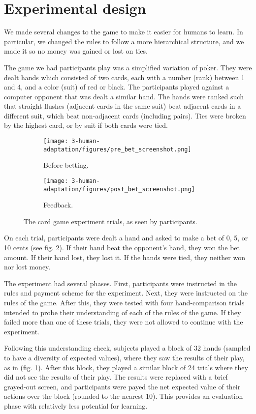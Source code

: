 \section{Experimental design}
We made several changes to the game to make it easier for humans to learn. In particular, we changed the rules to follow a more hierarchical structure, and we made it so no money was gained or lost on ties. \par
The game we had participants play was a simplified variation of poker. They were dealt hands which consisted of two cards, each with a number (rank) between 1 and 4, and a color (suit) of red or black. The participants played against a computer opponent that was dealt a similar hand. The hands were ranked such that straight flushes (adjacent cards in the same suit) beat adjacent cards in a different suit, which beat non-adjacent cards (including pairs). Ties were broken by the highest card, or by suit if both cards were tied. \par
\begin{figure}
\centering
\begin{subfigure}[b]{0.5\textwidth}
\texttt{[image: 3-human-adaptation/figures/pre\_bet\_screenshot.png]}
\caption{Before betting.}
\end{subfigure}%
\begin{subfigure}[b]{0.5\textwidth}
\texttt{[image: 3-human-adaptation/figures/post\_bet\_screenshot.png]}
\caption{Feedback.} \label{fig_human_betting_trial_feedback}
\end{subfigure}%
\caption{The card game experiment trials, as seen by participants.} \label{fig_human_betting_trial}
\end{figure}
On each trial, participants were dealt a hand and asked to make a bet of 0, 5, or 10 cents (see fig. \ref{fig_human_betting_trial}). If their hand beat the opponent's hand, they won the bet amount. If their hand lost, they lost it. If the hands were tied, they neither won nor lost money. \par
The experiment had several phases. First, participants were instructed in the rules and payment scheme for the experiment. Next, they were instructed on the rules of the game. After this, they were tested with four hand-comparison trials intended to probe their understanding of each of the rules of the game. If they failed more than one of these trials, they were not allowed to continue with the experiment. \par
Following this understanding check, subjects played a block of 32 hands (sampled to have a diversity of expected values), where they saw the results of their play, as in (fig. \ref{fig_human_betting_trial_feedback}). After this block, they played a similar block of 24 trials where they did not see the results of their play. The results were replaced with a brief grayed-out screen, and participants were payed the net expected value of their actions over the block (rounded to the nearest 10). This provides an evaluation phase with relatively less potential for learning. \par
